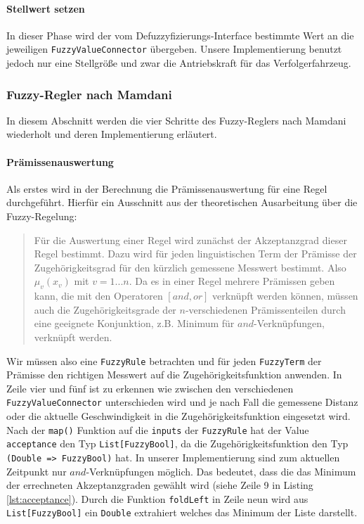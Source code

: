 \documentclass[12pt,a4paper,bibliography=totocnumbered,listof=totocnumbered, abstracton]{scrartcl}
\def\code#1{\texttt{#1}}
\theoremstyle{Umgebung}
\begin{document}
\paragraph{Stellwert setzen}

In dieser Phase wird der vom Defuzzyfizierungs-Interface bestimmte Wert an die jeweiligen \code{FuzzyValueConnector} übergeben. Unsere Implementierung benutzt jedoch nur eine Stellgröße und zwar die Antriebskraft für das Verfolgerfahrzeug.

\label{section:fuzzy-impl}
\subsubsection{Fuzzy-Regler nach Mamdani}

In diesem Abschnitt werden die vier Schritte des Fuzzy-Reglers nach Mamdani wiederholt und deren Implementierung erläutert.

\paragraph{Prämissenauswertung}

Als erstes wird in der Berechnung die Prämissenauswertung für eine Regel durchgeführt. Hierfür ein Ausschnitt aus der theoretischen Ausarbeitung über die Fuzzy-Regelung:

\begin{quote}Für die Auswertung einer Regel wird zunächst der Akzeptanzgrad dieser Regel bestimmt. Dazu wird für jeden linguistischen Term der Prämisse der Zugehörigkeitsgrad für den kürzlich gemessene Messwert bestimmt. Also $\mu_v (x_v)$ mit $v = 1...n$. Da es in einer Regel mehrere Prämissen geben kann, die mit den Operatoren $\left[and, or\right]$ verknüpft werden können, müssen auch die Zugehörigkeitsgrade der $n$-verschiedenen Prämissenteilen durch eine geeignete Konjunktion, z.B. Minimum für $and$-Verknüpfungen, verknüpft werden. \end{quote}

Wir müssen also eine \code{FuzzyRule} betrachten und für jeden \code{FuzzyTerm} der Prämisse den richtigen Messwert auf die Zugehörigkeitsfunktion anwenden. In Zeile vier und fünf ist zu erkennen wie zwischen den verschiedenen \code{FuzzyValueConnector} unterschieden wird und je nach Fall die gemessene Distanz oder die aktuelle Geschwindigkeit in die Zugehörigkeitsfunktion eingesetzt wird. Nach der \code{map()} Funktion auf die \code{inputs} der \code{FuzzyRule} hat der Value \code{acceptance} den Typ \code{List[FuzzyBool]}, da die Zugehörigkeitsfunktion den Typ \code{(Double => FuzzyBool)} hat.  In unserer Implementierung sind zum aktuellen Zeitpunkt nur $and$-Verknüpfungen möglich. Das bedeutet, dass die das Minimum der errechneten Akzeptanzgraden gewählt wird (siehe Zeile 9 in Listing \ref{lst:acceptance}). Durch die Funktion \code{foldLeft} in Zeile neun wird aus \code{List[FuzzyBool]} ein \code{Double} extrahiert welches das Minimum der Liste darstellt.
\end{document}
